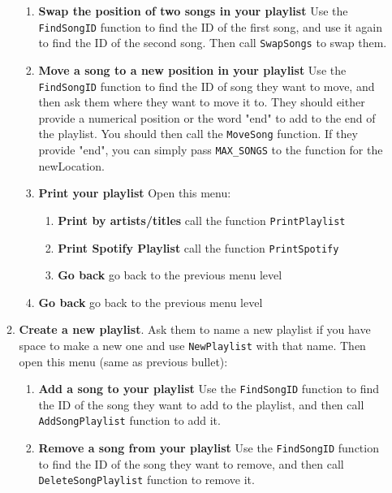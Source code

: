 \begin{enumerate}
\begin{enumerate}
\begin{enumerate}
                    \item \textbf{Swap the position of two songs in your playlist} Use the \texttt{FindSongID} function to find the ID of the first song, and use it again to find the ID of the second song. Then call \texttt{SwapSongs} to swap them. 
                    \item \textbf{Move a song to a new position in your playlist} Use the \texttt{FindSongID} function to find the ID of song they want to move, and then ask them where they want to move it to. They should either provide a numerical position or the word "end" to add to the end of the playlist. You should then call the \texttt{MoveSong} function. If they provide "end", you can simply pass \texttt{MAX_SONGS} to the function for the newLocation.
                    \item \textbf{Print your playlist} Open this menu:
                        \begin{enumerate}
                            \item \textbf{Print by artists/titles} call the function \texttt{PrintPlaylist}
                            \item \textbf{Print Spotify Playlist} call the function \texttt{PrintSpotify}
                            \item \textbf{Go back} go back to the previous menu level
                        \end{enumerate} 
                    \item \textbf{Go back} go back to the previous menu level
                \end{enumerate}
            \item \textbf{Create a new playlist}. Ask them to name a new playlist if you have space to make a new one and use \texttt{NewPlaylist} with that name. Then open this menu (same as previous bullet):
                \begin{enumerate}
                    \item \textbf{Add a song to your playlist} Use the \texttt{FindSongID} function to find the ID of the song they want to add to the playlist, and then call \texttt{AddSongPlaylist} function to add it. 
                    \item \textbf{Remove a song from your playlist} Use the \texttt{FindSongID} function to find the ID of the song they want to remove, and then call \texttt{DeleteSongPlaylist} function to remove it. 

\end{enumerate}
\end{enumerate}
\end{enumerate}
